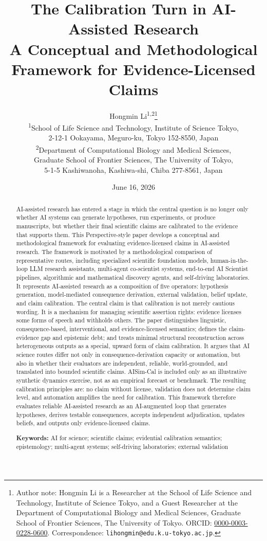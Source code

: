 \documentclass[11pt,a4paper]{article}
\title{\textbf{The Calibration Turn in AI-Assisted Research}\\[0.25em]
\large A Conceptual and Methodological Framework for Evidence-Licensed Claims}
\author{Hongmin Li\textsuperscript{1,2}\thanks{Author note: Hongmin Li is a Researcher at the School of Life Science and Technology, Institute of Science Tokyo, and a Guest Researcher at the Department of Computational Biology and Medical Sciences, Graduate School of Frontier Sciences, The University of Tokyo. ORCID: \href{https://orcid.org/0000-0003-0228-0600}{0000-0003-0228-0600}. Correspondence: \texttt{lihongmin@edu.k.u-tokyo.ac.jp}.}\\[0.45em]
\textsuperscript{1}School of Life Science and Technology, Institute of Science Tokyo,\\
2-12-1 Ookayama, Meguro-ku, Tokyo 152-8550, Japan\\[0.35em]
\textsuperscript{2}Department of Computational Biology and Medical Sciences,\\
Graduate School of Frontier Sciences, The University of Tokyo,\\
5-1-5 Kashiwanoha, Kashiwa-shi, Chiba 277-8561, Japan}
\date{June 16, 2026}
\begin{document}
\maketitle

\begin{abstract}
AI-assisted research has entered a stage in which the central question is no longer only whether AI systems can generate hypotheses, run experiments, or produce manuscripts, but whether their final scientific claims are calibrated to the evidence that supports them. This Perspective-style paper develops a conceptual and methodological framework for evaluating evidence-licensed claims in AI-assisted research. The framework is motivated by a methodological comparison of representative routes, including specialized scientific foundation models, human-in-the-loop LLM research assistants, multi-agent co-scientist systems, end-to-end AI Scientist pipelines, algorithmic and mathematical discovery agents, and self-driving laboratories. It represents AI-assisted research as a composition of five operators: hypothesis generation, model-mediated consequence derivation, external validation, belief update, and claim calibration. The central claim is that calibration is not merely cautious wording. It is a mechanism for managing scientific assertion rights: evidence licenses some forms of speech and withholds others. The paper distinguishes linguistic, consequence-based, interventional, and evidence-licensed semantics; defines the claim-evidence gap and epistemic debt; and treats minimal structural reconstruction across heterogeneous outputs as a special, upward form of claim calibration. It argues that AI science routes differ not only in consequence-derivation capacity or automation, but also in whether their evaluators are independent, reliable, world-grounded, and translated into bounded scientific claims. AISim-Cal is included only as an illustrative synthetic dynamics exercise, not as an empirical forecast or benchmark. The resulting calibration principles are: no claim without license, validation does not determine claim level, and automation amplifies the need for calibration. This framework therefore evaluates reliable AI-assisted research as an AI-augmented loop that generates hypotheses, derives testable consequences, accepts independent adjudication, updates beliefs, and outputs only evidence-licensed claims.

\textbf{Keywords:} AI for science; scientific claims; evidential calibration semantics; epistemology; multi-agent systems; self-driving laboratories; external validation
\end{abstract}
\end{document}

